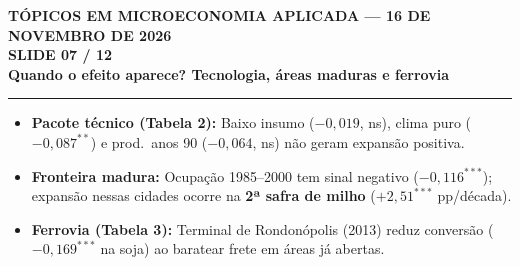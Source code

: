 \documentclass[11pt,a4paper]{article}
\newcommand{\slidenum}{1}
\begin{document}
\renewcommand{\slidenum}{7}
\noindent
\begin{minipage}{\textwidth}
\begin{center}
{\color{cinza}\footnotesize\textbf{TÓPICOS EM MICROECONOMIA APLICADA --- 16 DE NOVEMBRO DE 2026}\\[1.2mm]}
{\color{cinza}\bfseries\Large SLIDE 07 / 12\\[1.5mm]}
{\color{verde}\bfseries\LARGE Quando o efeito aparece? Tecnologia, áreas maduras e ferrovia\\[2.5mm]}
\rule{\textwidth}{1pt}
\end{center}
\end{minipage}
\vspace{1.5mm}

\begin{tcolorbox}[title={\bfseries\small ÂNCORAS DO SLIDE}]
\begin{itemize}[leftmargin=*,itemsep=1mm,topsep=0.5mm]
    \item \textbf{Pacote técnico (Tabela 2):} Baixo insumo ($-0{,}019$, ns), clima puro ($-0{,}087^{**}$) e prod.\ anos 90 ($-0{,}064$, ns) não geram expansão positiva.
    \item \textbf{Fronteira madura:} Ocupação 1985--2000 tem sinal negativo ($-0{,}116^{***}$); expansão nessas cidades ocorre na \textbf{2ª safra de milho} ($+2{,}51^{***}$ pp/década).
    \item \textbf{Ferrovia (Tabela 3):} Terminal de Rondonópolis (2013) reduz conversão ($-0{,}169^{***}$ na soja) ao baratear frete em áreas já abertas.
\end{itemize}
\end{tcolorbox}
\vspace{2mm}
\end{document}
